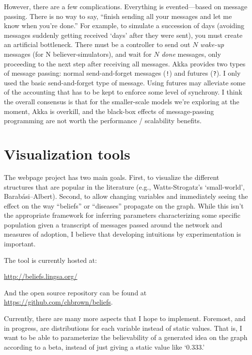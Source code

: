 \documentclass[11pt]{article}
\begin{document}
However, there are a few complications. Everything is evented---based on message passing. There is no way to say, ``finish sending all your messages and let me know when you're done.'' For example, to simulate a succession of days (avoiding messages suddenly getting received `days' after they were sent), you must create an artificial bottleneck. There must be a controller to send out $N$ \emph{wake-up} messages (for N believer-simulators), and wait for $N$ \emph{done} messages, only proceeding to the next step after receiving all messages.
Akka provides two types of message passing: normal send-and-forget messages (\texttt{!}) and futures (\texttt{?}).
I only used the basic send-and-forget type of message. Using futures may alleviate some of the accounting that has to be kept to enforce some level of synchrony. I think the overall consensus is that for the smaller-scale models we're exploring at the moment, Akka is overkill, and the black-box effects of message-passing programming are not worth the performance / scalability benefits.

\section{Visualization tools}

The webpage project has two main goals. First, to visualize the different structures that are popular in the literature (e.g., Watts-Strogatz's `small-world', Barab\'asi–Albert). Second, to allow changing variables and immediately seeing the effect on the way ``beliefs'' or ``diseases'' propagate on the graph. While this isn't the appropriate framework for inferring parameters characterizing some specific population given a transcript of messages passed around the network and measures of adoption, I believe that developing intuitions by experimentation is important.

The tool is currently hosted at:
\begin{center}
  \url{http://beliefs.lingsa.org/}
\end{center}
And the open source repository can be found at \url{https://github.com/chbrown/beliefs}.

Currently, there are many more aspects that I hope to implement. Foremost, and in progress, are distributions for each variable instead of static values. That is, I want to be able to parameterize the believability of a generated idea on the graph according to a beta, instead of just giving a static value like `$0.333$.'
\end{document}
